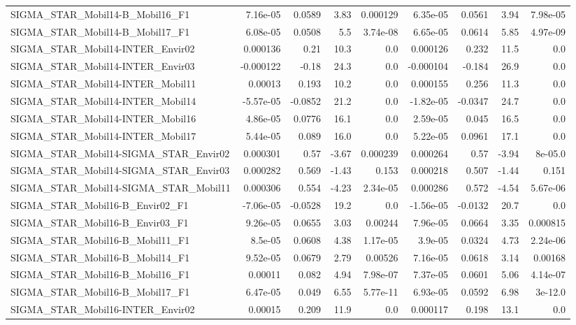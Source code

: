\begin{tabular}{lrrrrrrrr}
SIGMA_STAR_Mobil14-B_Mobil16_F1 & 7.16e-05 & 0.0589 & 3.83 & 0.000129 & 6.35e-05 & 0.0561 & 3.94 & 7.98e-05 \\
SIGMA_STAR_Mobil14-B_Mobil17_F1 & 6.08e-05 & 0.0508 & 5.5 & 3.74e-08 & 6.65e-05 & 0.0614 & 5.85 & 4.97e-09 \\
SIGMA_STAR_Mobil14-INTER_Envir02 & 0.000136 & 0.21 & 10.3 & 0.0 & 0.000126 & 0.232 & 11.5 & 0.0 \\
SIGMA_STAR_Mobil14-INTER_Envir03 & -0.000122 & -0.18 & 24.3 & 0.0 & -0.000104 & -0.184 & 26.9 & 0.0 \\
SIGMA_STAR_Mobil14-INTER_Mobil11 & 0.00013 & 0.193 & 10.2 & 0.0 & 0.000155 & 0.256 & 11.3 & 0.0 \\
SIGMA_STAR_Mobil14-INTER_Mobil14 & -5.57e-05 & -0.0852 & 21.2 & 0.0 & -1.82e-05 & -0.0347 & 24.7 & 0.0 \\
SIGMA_STAR_Mobil14-INTER_Mobil16 & 4.86e-05 & 0.0776 & 16.1 & 0.0 & 2.59e-05 & 0.045 & 16.5 & 0.0 \\
SIGMA_STAR_Mobil14-INTER_Mobil17 & 5.44e-05 & 0.089 & 16.0 & 0.0 & 5.22e-05 & 0.0961 & 17.1 & 0.0 \\
SIGMA_STAR_Mobil14-SIGMA_STAR_Envir02 & 0.000301 & 0.57 & -3.67 & 0.000239 & 0.000264 & 0.57 & -3.94 & 8e-05.0 \\
SIGMA_STAR_Mobil14-SIGMA_STAR_Envir03 & 0.000282 & 0.569 & -1.43 & 0.153 & 0.000218 & 0.507 & -1.44 & 0.151 \\
SIGMA_STAR_Mobil14-SIGMA_STAR_Mobil11 & 0.000306 & 0.554 & -4.23 & 2.34e-05 & 0.000286 & 0.572 & -4.54 & 5.67e-06 \\
SIGMA_STAR_Mobil16-B_Envir02_F1 & -7.06e-05 & -0.0528 & 19.2 & 0.0 & -1.56e-05 & -0.0132 & 20.7 & 0.0 \\
SIGMA_STAR_Mobil16-B_Envir03_F1 & 9.26e-05 & 0.0655 & 3.03 & 0.00244 & 7.96e-05 & 0.0664 & 3.35 & 0.000815 \\
SIGMA_STAR_Mobil16-B_Mobil11_F1 & 8.5e-05 & 0.0608 & 4.38 & 1.17e-05 & 3.9e-05 & 0.0324 & 4.73 & 2.24e-06 \\
SIGMA_STAR_Mobil16-B_Mobil14_F1 & 9.52e-05 & 0.0679 & 2.79 & 0.00526 & 7.16e-05 & 0.0618 & 3.14 & 0.00168 \\
SIGMA_STAR_Mobil16-B_Mobil16_F1 & 0.00011 & 0.082 & 4.94 & 7.98e-07 & 7.37e-05 & 0.0601 & 5.06 & 4.14e-07 \\
SIGMA_STAR_Mobil16-B_Mobil17_F1 & 6.47e-05 & 0.049 & 6.55 & 5.77e-11 & 6.93e-05 & 0.0592 & 6.98 & 3e-12.0 \\
SIGMA_STAR_Mobil16-INTER_Envir02 & 0.00015 & 0.209 & 11.9 & 0.0 & 0.000117 & 0.198 & 13.1 & 0.0 \\

\end{tabular}
